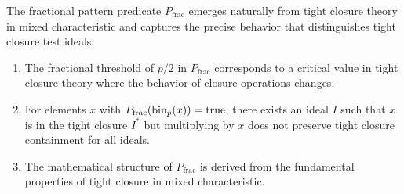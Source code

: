\begin{theorem}\label{thm:tight-closure-predicate-motivation}
The fractional pattern predicate $P_{\text{frac}}$ emerges naturally from tight closure theory in mixed characteristic and captures the precise behavior that distinguishes tight closure test ideals:

\begin{enumerate}
    \item The fractional threshold of $p/2$ in $P_{\text{frac}}$ corresponds to a critical value in tight closure theory where the behavior of closure operations changes.
    
    \item For elements $x$ with $P_{\text{frac}}(\operatorname{bin}_p(x)) = \text{true}$, there exists an ideal $I$ such that $x$ is in the tight closure $I^*$ but multiplying by $x$ does not preserve tight closure containment for all ideals.
    
    \item The mathematical structure of $P_{\text{frac}}$ is derived from the fundamental properties of tight closure in mixed characteristic.
\end{enumerate}
\end{theorem}

